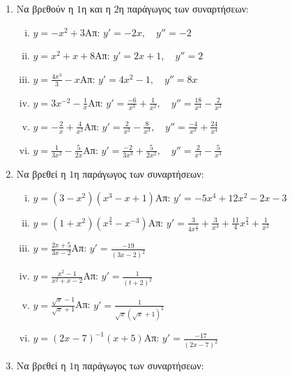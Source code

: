 \documentclass[a4paper,12pt]{article}
\begin{document}
\begin{center}
\end{center}

\vspace{1cm}



\begin{enumerate}
\item Να βρεθούν η $1$η και η $2$η παράγωγος των συναρτήσεων:
\begin{enumerate}[i.]
\item $y=-x^2+3$\hfill Απ: $y'=-2x,\quad y''=-2$
\item $y=x^2+x+8$\hfill Απ: $y'=2x+1,\quad y''=2$
\item $y=\frac{4x^3}{3}-x$\hfill Απ: $y'=4x^2-1,\quad y''=8x$
\item $y=3x^{-2}-\frac{1}{x}$\hfill Απ: $y'=\frac{-6}{x^3}+\frac{1}{x^2},\quad y''= \frac{18}{x^4}-\frac{2}{x^3}$
\item $y=-\frac{2}{x}+\frac{4}{x^{2}}$\hfill Απ: $y'=\frac{2}{x^2}-\frac{8}{x^3},\quad y''=\frac{-4}{x^3}+\frac{24}{x^4}$
\item $y=\frac{1}{3x^2}-\frac{5}{2x}$\hfill Απ: $y'=\frac{-2}{3x^3}+\frac{5}{2x^2},\quad y''=\frac{2}{x^4}-\frac{5}{x^3}$
\end{enumerate}

\item Να βρεθεί η $1$η παράγωγος των συναρτήσεων:

\begin{enumerate}[i.]
\item $y=(3-x^2)(x^3-x+1)$\hfill Απ: $y'=-5x^4+12x^2-2x-3$
\item $y=(1+x^2)(x^{\frac{3}{4}}-x^{-3})$\hfill Απ: $y'=\frac{3}{4x^{\frac{1}{4}}}+\frac{3}{x^4}+\frac{11}{4}x^{\frac{7}{4}}+\frac{1}{x^2}$
\item $y=\frac{2x+5}{3x-2}$\hfill Απ: $y'=\frac{-19}{(3x-2)^2}$
\item $y=\frac{x^2-1}{x^2+x-2}$\hfill Απ: $y'=\frac{1}{(t+2)^2}$
\item $y=\frac{\sqrt{x}-1}{\sqrt{x}+1}$\hfill Απ: $y'=\frac{1}{\sqrt{x}(\sqrt{x}+1)^2}$
\item $y=(2x-7)^{-1}(x+5)$\hfill Απ: $y'=\frac{-17}{(2x-7)^2}$
\end{enumerate}

\item Να βρεθεί η $1$η παράγωγος των συναρτήσεων:


\end{enumerate}
\end{document}
